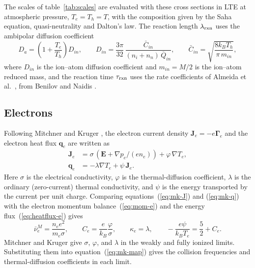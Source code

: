 The scales of table~\ref{tab:scales} are evaluated with these cross sections in LTE at atmospheric pressure, \(T_e=T_h=T\), with the composition given by the Saha equation, quasi-neutrality and Dalton's law. The reaction length \(\lambda_{\rm rxn}\) uses the ambipolar diffusion coefficient
\begin{equation}
D_a=\left(1+\frac{T_e}{T_h}\right)D_{in},\qquad
D_{in}=\frac{3\pi}{32}\,\frac{\bar C_{in}}{(n_i+n_n)\,\overline{Q}_{in}},\qquad
\bar C_{in}=\sqrt{\frac{8k_BT_h}{\pi\,m_{in}}},
\label{eq:Da}
\end{equation}
where \(D_{in}\) is the ion--atom diffusion coefficient \cite{Almeida2008} and \(m_{in}=M/2\) is the ion--atom reduced mass, and the reaction time \(\tau_{\rm rxn}\) uses the rate coefficients of Almeida et al.\ \cite{Almeida2008}, from Benilov and Naidis \cite{benilov1998ionization}.


\subsection{Electrons}
\label{app:electrons}
Following Mitchner and Kruger \cite{mitchner1973partially}, the electron current density \(\mathbf{J}_e=-e\boldsymbol{\Gamma}_e\) and the electron heat flux \(\mathbf{q}_e\) are written as
\begin{align}
\mathbf{J}_e &= \sigma\,(\mathbf{E}+\nabla p_e/(en_e))+\varphi\,\nabla T_e,
\label{eq:mk-J}\\
\mathbf{q}_e &= -\lambda\nabla T_e+\psi\,\mathbf{J}_e.
\label{eq:mk-q}
\end{align}
Here \(\sigma\) is the electrical conductivity, \(\varphi\) is the thermal-diffusion coefficient, \(\lambda\) is the ordinary (zero-current) thermal conductivity, and \(\psi\) is the energy transported by the current per unit charge. Comparing equations~(\ref{eq:mk-J}) and (\ref{eq:mk-q}) with the electron momentum balance~(\ref{eq:mom-e}) and the energy flux~(\ref{eq:heatflux-e}) gives
\begin{equation}
\bar\nu^M_e=\frac{n_ee^2}{m_e\sigma},\qquad
C_e=\frac{e}{k_B}\frac{\varphi}{\sigma},\qquad
\kappa_e=\lambda,\qquad
-\frac{e\psi}{k_BT_e}=\frac52+C_e .
\label{eq:mk-map}
\end{equation}
Mitchner and Kruger \cite{mitchner1973partially} give \(\sigma\), \(\varphi\), and \(\lambda\) in the weakly and fully ionized limits. Substituting them into equation~(\ref{eq:mk-map}) gives the collision frequencies and thermal-diffusion coefficients in each limit.

